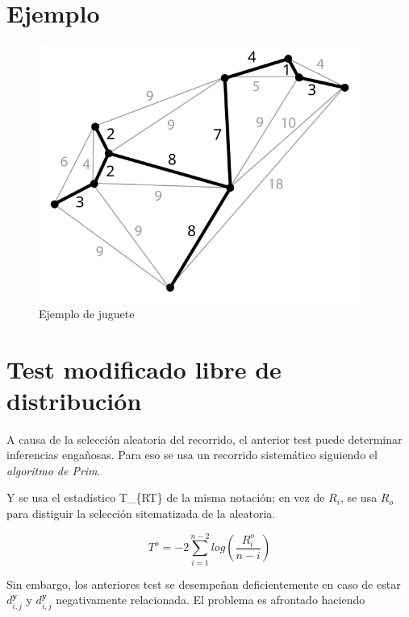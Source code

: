\documentclass[]{book}
\begin{document}
\section{Ejemplo}\label{ejemplo}

\begin{figure}

{\centering \includegraphics[width=400,height=320]{Minimum_spanning_tree} 

}

\caption{Ejemplo de juguete}\label{fig:unnamed-chunk-10}
\end{figure}

\section{Test modificado libre de
distribución}\label{test-modificado-libre-de-distribucion}

A causa de la selección aleatoria del recorrido, el anterior test puede
determinar inferencias engañosas. Para eso se usa un recorrido
sistemático siguiendo el \emph{algoritmo de Prim}.
\citep{heller2012consistent}

Y se usa el estadístico T\_\{RT\} de la misma notación; en vez de
\(R_i\), se usa \(R_o\) para distiguir la selección sitematizada de la
aleatoria.

\[T^{o} = -2 \displaystyle \sum_{i=1}^{n-2} log \left( \dfrac{R_i^o}{n-i}\right)\]

Sin embargo, los anteriores test se desempeñan deficientemente en caso
de estar \(d_{i,j}^{\mathbf{y}}\) y \(d_{i,j}^{\mathbf{y}}\)
negativamente relacionada. El problema es afrontado haciendo
\end{document}
